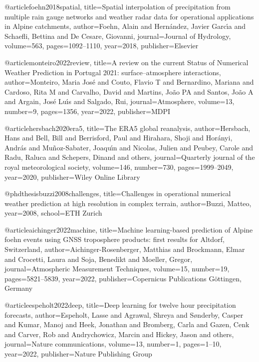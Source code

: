 @article{foehn2018spatial,
  title={Spatial interpolation of precipitation from multiple rain gauge networks and weather radar data for operational applications in Alpine catchments},
  author={Foehn, Alain and Hern{\'a}ndez, Javier Garc{\'\i}a and Schaefli, Bettina and De Cesare, Giovanni},
  journal={Journal of Hydrology},
  volume={563},
  pages={1092--1110},
  year={2018},
  publisher={Elsevier}
}


@article{monteiro2022review,
  title={A review on the current Status of Numerical Weather Prediction in Portugal 2021: surface--atmosphere interactions},
  author={Monteiro, Maria Jos{\'e} and Couto, Flavio T and Bernardino, Mariana and Cardoso, Rita M and Carvalho, David and Martins, Jo{\~a}o PA and Santos, Jo{\~a}o A and Argain, Jos{\'e} Lu{\'\i}s and Salgado, Rui},
  journal={Atmosphere},
  volume={13},
  number={9},
  pages={1356},
  year={2022},
  publisher={MDPI}
}

@article{hersbach2020era5,
  title={The ERA5 global reanalysis},
  author={Hersbach, Hans and Bell, Bill and Berrisford, Paul and Hirahara, Shoji and Hor{\'a}nyi, Andr{\'a}s and Mu{\~n}oz-Sabater, Joaqu{\'\i}n and Nicolas, Julien and Peubey, Carole and Radu, Raluca and Schepers, Dinand and others},
  journal={Quarterly journal of the royal meteorological society},
  volume={146},
  number={730},
  pages={1999--2049},
  year={2020},
  publisher={Wiley Online Library}
}

@phdthesis{buzzi2008challenges,
  title={Challenges in operational numerical weather prediction at high resolution in complex terrain},
  author={Buzzi, Matteo},
  year={2008},
  school={ETH Zurich}
}

@article{aichinger2022machine,
  title={Machine learning-based prediction of Alpine foehn events using GNSS troposphere products: first results for Altdorf, Switzerland},
  author={Aichinger-Rosenberger, Matthias and Brockmann, Elmar and Crocetti, Laura and Soja, Benedikt and Moeller, Gregor},
  journal={Atmospheric Measurement Techniques},
  volume={15},
  number={19},
  pages={5821--5839},
  year={2022},
  publisher={Copernicus Publications G{\"o}ttingen, Germany}
}

@article{espeholt2022deep,
  title={Deep learning for twelve hour precipitation forecasts},
  author={Espeholt, Lasse and Agrawal, Shreya and S{\o}nderby, Casper and Kumar, Manoj and Heek, Jonathan and Bromberg, Carla and Gazen, Cenk and Carver, Rob and Andrychowicz, Marcin and Hickey, Jason and others},
  journal={Nature communications},
  volume={13},
  number={1},
  pages={1--10},
  year={2022},
  publisher={Nature Publishing Group}
}

